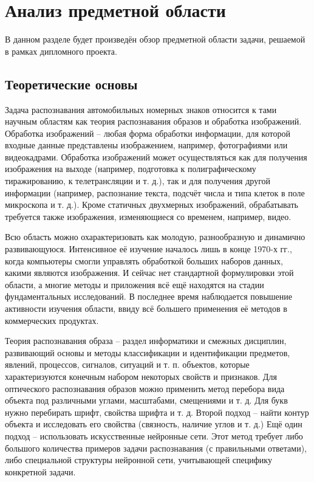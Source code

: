 \section{Анализ предметной области}
\label{sec:domain}

В данном разделе будет произведён обзор предметной области задачи, решаемой в рамках дипломного проекта.

\subsection{Теоретические основы}
\label{sub:domain:theory_basics}
Задача распознавания автомобильных номерных знаков относится к тами научным областям как теория распознавания образов и обработка изображений.
Обработка изображений -- любая форма обработки информации, для которой входные данные представлены изображением, например, фотографиями или видеокадрами. Обработка изображений может осуществляться как для получения изображения на выходе (например, подготовка к полиграфическому тиражированию, к телетрансляции и т. д.), так и для получения другой информации (например, распознание текста, подсчёт числа и типа клеток в поле микроскопа и т. д.). Кроме статичных двухмерных изображений, обрабатывать требуется также изображения, изменяющиеся со временем, например, видео.~\cite{image_precessing}

Всю область можно охарактеризовать как молодую, разнообразную и динамично развивающуюся. Интенсивное её изучение началось лишь в конце 1970-х гг., когда компьютеры смогли управлять обработкой больших наборов данных, какими являются изображения. И сейчас нет стандартной формулировки этой области, а многие методы и приложения всё ещё находятся на стадии фундаментальных исследований. В последнее время наблюдается повышение активности изучения области, ввиду всё большего применения её методов в коммерческих продуктах.

Теория распознавания образа -- раздел информатики и смежных дисциплин, развивающий основы и методы классификации и идентификации предметов, явлений, процессов, сигналов, ситуаций и т. п. объектов, которые характеризуются конечным набором некоторых свойств и признаков.
Для оптического распознавания образов можно применить метод перебора вида объекта под различными углами, масштабами, смещениями и т. д. Для букв нужно перебирать шрифт, свойства шрифта и т. д.
Второй подход -- найти контур объекта и исследовать его свойства (связность, наличие углов и т. д.)
Ещё один подход -- использовать искусственные нейронные сети. Этот метод требует либо большого количества примеров задачи распознавания (с правильными ответами), либо специальной структуры нейронной сети, учитывающей специфику конкретной задачи.

